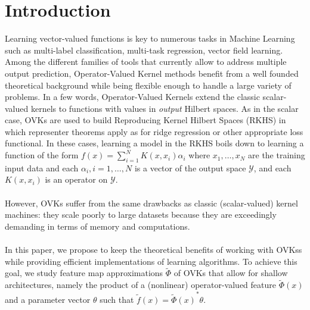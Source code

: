 \documentclass[twoside,11pt]{article}
\begin{document}

\section{Introduction}
Learning vector-valued functions is key to numerous tasks in Machine Learning
such as multi-label classification, multi-task regression, vector field
learning.  Among the different families of tools that currently allow to
address multiple output prediction, Operator-Valued Kernel methods
\citep{Micchelli2005,Carmeli2010,Kadri_aistat10, Brouard2011,Alvarez2012}
benefit from a well founded theoretical background while being flexible enough
to handle a large variety of problems. In a few words, Operator-Valued Kernels
extend the classic scalar-valued kernels to functions with values in
\emph{output} Hilbert spaces. As in the scalar case, \acfp{OVK} are used to
build Reproducing Kernel Hilbert Spaces (\acs{RKHS}) in which representer
theorems apply as for ridge regression or other appropriate loss functional. In
these cases, learning a model in the \acs{RKHS} boils down to learning a
function of the form $f(x)=\sum_{i=1}^N K(x,x_i)\alpha_i$ where $x_1, \ldots,
x_N$ are the training input data and each $\alpha_i, i=1, \ldots, N$ is a
vector of the output space $\mathcal{Y}$, and each $K(x,x_i)$ is an operator on
$\mathcal{Y}$.  \paragraph{} However, \acsp{OVK} suffer from the same drawbacks
as classic (sca\-lar-va\-lued) kernel machines: they scale poorly to large
datasets because they are exceedingly demanding in terms of memory and
computations.

\paragraph{}
In this paper, we propose to keep the theoretical benefits of working with
\acsp{OVK}s while providing efficient implementations of learning algorithms.
To achieve this goal, we study feature map approximations $\widetilde{\Phi}$ of
\acsp{OVK} that allow for shallow architectures, namely the product of a
(nonlinear) operator-valued feature $\widetilde{\Phi}(x)$ and a parameter
vector $\theta$ such that $\widetilde{f}(x) = {\widetilde{\Phi}(x)}^* \theta$.
\end{document}
